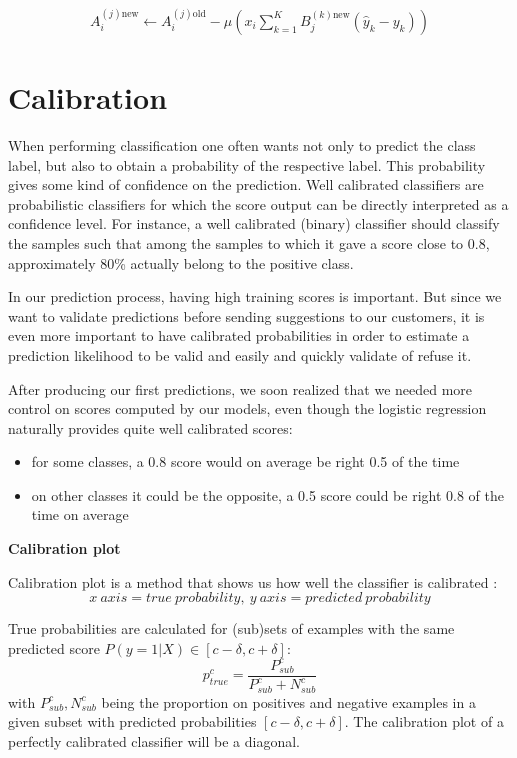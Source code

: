 \begin{align}
	A_i^{(j)\mbox{new}} \leftarrow A_i^{(j)\mbox{old}} - 
	\mu 
	\left(
		x_i \sum_{k=1}^K B_j^{(k)\mbox{new}} (\hat y_k - y_k) 
	\right)
\end{align}



\pagebreak
\section{Calibration}

When performing classification one often wants not only to predict the class label, but also to obtain a probability of the respective label. This probability gives some kind of confidence on the prediction.
Well calibrated classifiers are probabilistic classifiers for which the score output can be directly interpreted as a confidence level. For instance, a well calibrated (binary) classifier should classify the samples such that among the samples to which it gave a score close to 0.8, approximately 80\% actually belong to the positive class.

In our prediction process, having high training scores is important. But since we want to validate predictions before sending suggestions to our customers, it is even more important to have calibrated probabilities in order to estimate a prediction likelihood to be valid and easily and quickly validate of refuse it.

After producing our first predictions, we soon realized that we needed more control on scores computed by our models, even though the logistic regression naturally provides quite well calibrated scores:
\begin{itemize}
	\item for some classes, a 0.8 score would on average be right 0.5 of the time
	\item on other classes it could be the opposite, a 0.5 score could be right 0.8 of the time on average
\end{itemize}

\textbf{Calibration plot}

Calibration plot is a method that shows us how well the classifier is calibrated \cite{Calibration}: $$x\ axis = true\ probability,\ y\ axis=predicted\ probability$$

True probabilities are calculated for (sub)sets of examples with the same predicted score $P(y=1|X) \in [c-\delta, c+\delta]$: $$ p_{true}^c = \frac{P_{sub}^c}{P_{sub}^c + N_{sub}^c}$$ with $P_{sub}^c, N_{sub}^c$ being the proportion on positives and negative examples in a given subset with predicted probabilities $[c-\delta, c+\delta]$. The calibration plot of a perfectly calibrated classifier will be a diagonal.



